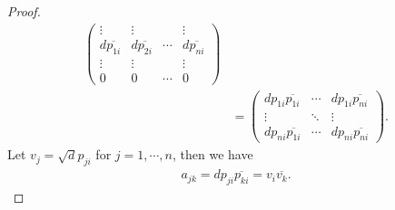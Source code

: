 \documentclass[11pt]{article}
\theoremstyle{definition}
\numberwithin{equation}{subsection}
\begin{document}
\begin{proof}
\begin{align*}
\begin{pmatrix}
        \vdots & \vdots &  & \vdots \\
        d\overline{p_{1i}} & d\overline{p_{2i}} & \cdots & d\overline{p_{ni}} \\
        \vdots & \vdots &  & \vdots \\
        0 & 0 & \cdots & 0
    \end{pmatrix} \\
    & = \begin{pmatrix}
        d p_{1i}\overline{p_{1i}} & \cdots & d p_{1i} \overline{p_{ni}} \\
        \vdots & \ddots & \vdots \\
        d p_{ni}\overline{p_{1i}} & \cdots & d p_{ni} \overline{p_{ni}}
    \end{pmatrix}.
\end{align*}
Let $v_j = \sqrt{d}p_{ji}$ for $j = 1, \cdots, n$, then we have 
\begin{align*}
    a_{jk} = d p_{ji}\overline{p_{ki}} = v_i \overline{v_k}.
\end{align*}
\end{proof}

\medskip
\end{document}
